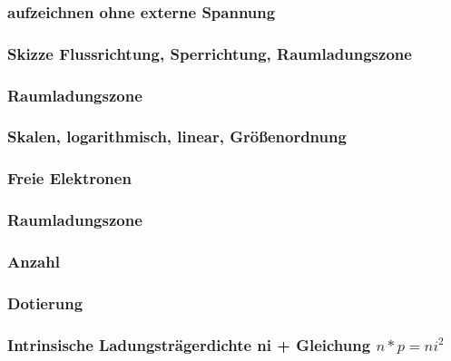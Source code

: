 \documentclass{article}
\begin{document}
	\subsubsection{aufzeichnen ohne externe Spannung}
	
	
	\subsubsection{Skizze Flussrichtung, Sperrichtung, Raumladungszone}
	\subsubsection{Raumladungszone}
	\subsubsection{Skalen, logarithmisch, linear, Größenordnung}
	\subsubsection{Freie Elektronen}
	\subsubsection{Raumladungszone}
	\subsubsection{Anzahl}
	\subsubsection{Dotierung}
	
	\subsubsection{Intrinsische Ladungsträgerdichte ni + Gleichung $n*p=ni^2$ }
\end{document}
